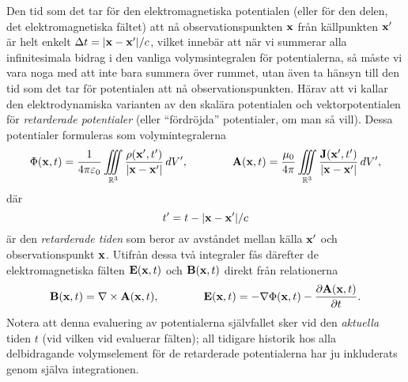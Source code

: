 \smallskip\centerline{}
\medskip
\noindent
Den tid som det tar f{\"o}r den elektromagnetiska potentialen (eller f{\"o}r
den delen, det elektromagnetiska f{\"a}ltet) att n{\aa} observationspunkten
${\bf x}$ fr{\aa}n k{\"a}llpunkten ${\bf x}'$ {\"a}r helt enkelt
$\Delta t = |{\bf x}-{\bf x}'|/c$, vilket inneb{\"a}r att n{\"a}r vi summerar
alla infinitesimala bidrag i den vanliga volymsintegralen f{\"o}r potentialerna,
s{\aa} m{\aa}ste vi vara noga med att inte bara summera {\"o}ver rummet, utan
{\"a}ven ta h{\"a}nsyn till den tid som det tar f{\"o}r potentialen att n{\aa}
observationspunkten. H{\"a}rav att vi kallar den elektrodynamiska varianten av
den skal{\"a}ra potentialen och vektorpotentialen f{\"o}r {\it retarderade
potentialer} (eller ``f{\"o}rdr{\"o}jda'' potentialer, om man s{\aa} vill).
Dessa potentialer formuleras som volymintegralerna
$$
  \Phi({\bf x},t)={{1}\over{4\pi\varepsilon_0}}\iiint_{{\Bbb R}^3}
    {{\rho({\bf x}',t')}\over{|{\bf x}-{\bf x}'|}}\,dV',\qquad\qquad
  {\bf A}({\bf x},t)={{\mu_0}\over{4\pi}}\iiint_{{\Bbb R}^3}
    {{{\bf J}({\bf x}',t')}\over{|{\bf x}-{\bf x}'|}}\,dV',
$$
d{\"a}r
$$
  t' = t - |{\bf x}-{\bf x}'|/c
$$
{\"a}r den {\it retarderade tiden} som beror av avst{\aa}ndet mellan k{\"a}lla
${\bf x}'$ och observationspunkt ${\bf x}$. Utifr{\aa}n dessa tv{\aa} integraler
f{\aa}s d{\"a}refter de elektromagnetiska f{\"a}lten ${\bf E}({\bf x},t)$ och
${\bf B}({\bf x},t)$ direkt fr{\aa}n relationerna
$$
  {\bf B}({\bf x},t)=\nabla\times{\bf A}({\bf x},t),\qquad\qquad
  {\bf E}({\bf x},t)
    =-\nabla\Phi({\bf x},t)-{{\partial{\bf A}({\bf x},t)}\over{\partial t}}.
$$
Notera att denna evaluering av potentialerna sj{\"a}lvfallet sker vid den
{\it aktuella} tiden $t$ (vid vilken vid evaluerar f{\"a}lten); all tidigare
historik hos alla delbidragande volymselement f{\"o}r de retarderade
potentialerna har ju inkluderats genom sj{\"a}lva integrationen.
\vfill\eject

